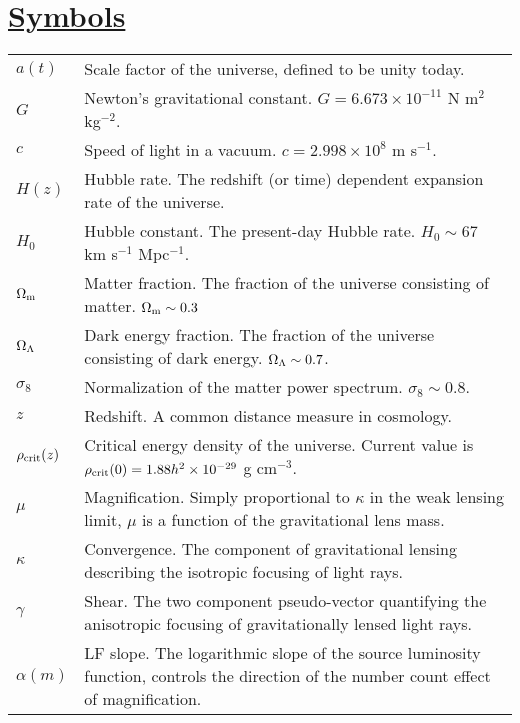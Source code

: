 \begin{acronym}[CFHTLenS]

\end{acronym}


\section*{\underline{Symbols}}

\begin{tabular}{ll}
$a(t)$ & Scale factor of the universe, defined to be unity today. \\
$G$ & Newton's gravitational constant. $G = 6.673 \times 10^{-11}$ N m$^2$ kg$^{-2}$.\\
$c$ & Speed of light in a vacuum. $c = 2.998 \times 10^8$ m s$^{-1}$. \\
$H(z)$ & Hubble rate. The redshift (or time) dependent expansion rate of the universe. \\
$H_0$ & Hubble constant. The present-day Hubble rate. $H_0 \sim 67$ km s$^{-1}$ Mpc$^{-1}$. \\
$\Omega_{\rm m}$ & Matter fraction. The fraction of the universe consisting of matter. $\Omega_{\rm m} \sim 0.3$ \\
$\Omega_{\rm \Lambda}$ & Dark energy fraction. The fraction of the universe consisting of dark energy. $\Omega_{\rm \Lambda} \sim 0.7$. \\
$\sigma_8$ & Normalization of the matter power spectrum.  $\sigma_8 \sim 0.8$.\\
$z$ & Redshift. A common distance measure in cosmology. \\
$\rho_{\rm crit}(z)$ & Critical energy density of the universe. Current value is $\rho_{\rm crit}(0) = 1.88h^2 \times 10^{-29}$ g cm$^{-3}$. \\
$\mu$ & Magnification. Simply proportional to $\kappa$ in the weak lensing limit, $\mu$ is a function of the gravitational lens mass. \\
$\kappa$ & Convergence. The component of gravitational lensing describing the isotropic focusing of light rays. \\
$\gamma$ & Shear. The two component pseudo-vector quantifying the anisotropic focusing of gravitationally lensed light rays. \\
$\alpha(m)$ & \acs{LF} slope. The logarithmic slope of the source luminosity function, controls the direction of the number count effect of magnification. \\
\end{tabular}

